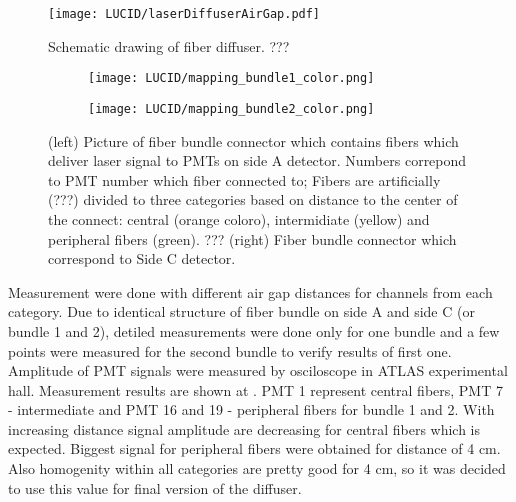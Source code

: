 \begin{figure}
\centering
\texttt{[image: LUCID/laserDiffuserAirGap.pdf]}
\caption{Schematic drawing of fiber diffuser. ???}
\label{fig:laserDiffuserSchematics}
\end{figure}


\begin{figure}
\centering
\begin{subfigure}{.45\textwidth}
  \centering
  \texttt{[image: LUCID/mapping\_bundle1\_color.png]}
\end{subfigure}%
\begin{subfigure}{.45\textwidth}
  \centering
  \texttt{[image: LUCID/mapping\_bundle2\_color.png]}
\end{subfigure}
\caption{(left) Picture of fiber bundle connector which contains fibers which deliver laser signal to PMTs on side A detector. Numbers correpond to PMT number which fiber connected to; 
	 Fibers are artificially (???) divided to three categories based on distance to the center of the connect: central (orange coloro), intermidiate (yellow) and peripheral fibers (green).
	 ???
	 (right) Fiber bundle connector which correspond to Side C detector.}
\label{fig:laserDiffuserMapping}
\end{figure}

Measurement were done with different air gap distances for channels from each category. Due to identical structure of fiber bundle on side A and side C (or bundle 1 and 2), detiled measurements
were done only for one bundle and a few points were measured for the second bundle to verify results of first one. Amplitude of PMT signals were measured by osciloscope in 
ATLAS experimental hall. Measurement results are shown at . PMT 1 represent central fibers, PMT 7 - intermediate and PMT 16 and 19 - peripheral
fibers for bundle 1 and 2. With increasing distance signal amplitude are decreasing for central fibers which is expected. Biggest signal for peripheral fibers were obtained for distance of 4 cm.
Also homogenity within all categories are pretty good for 4 cm, so it was decided to use this value for final version of the diffuser.






% 
% 
% 



